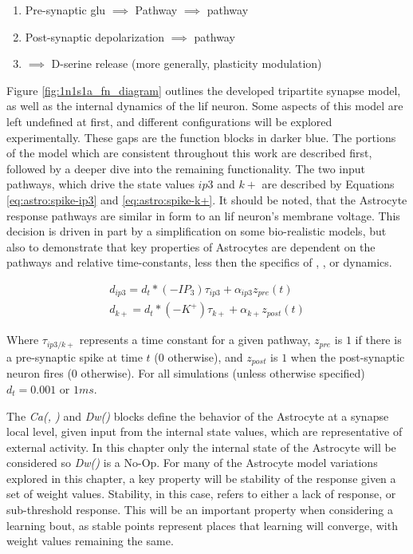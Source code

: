 \begin{enumerate}
  \item Pre-synaptic \Gls{glu} $\implies$ \ipt Pathway $\implies$ \ca pathway
  \item Post-synaptic depolarization \kp $\implies$ \ca pathway
  \item \ca $\implies$ D-serine release (more generally, plasticity modulation)
\end{enumerate}


Figure \ref{fig:1n1s1a_fn_diagram} outlines the developed tripartite synapse
model, as well as the internal dynamics of the \Gls{lif} neuron. Some aspects of this
model are left undefined at first, and different configurations will be explored
experimentally. These gaps are the function blocks in darker blue. The
portions of the model which are consistent throughout this work are described
first, followed by a deeper dive into the remaining functionality. The two input
pathways, which drive the state values $ip3$ and $k+$ are described by Equations
\ref{eq:astro:spike-ip3} and \ref{eq:astro:spike-k+}. It should be noted, that
the Astrocyte response pathways are similar in form to an \Gls{lif} neuron's membrane
voltage. This decision is driven in part by a simplification on some
bio-realistic models, but also to demonstrate that key properties of Astrocytes
are dependent on the pathways and relative time-constants, less then the specifics of
\ca, \ipt, or \kp dynamics.

\begin{align}
  d_{ip3} = d_t * (-IP_3)\tau_{ip3} + \alpha_{ip3} z_{pre}(t) \label{eq:astro:spike-ip3} \\
  d_{k+} = d_t * (-K^+)\tau_{k+} + \alpha_{k+} z_{post}(t) \label{eq:astro:spike-k+}
\end{align}

Where $\tau_{ip3/k+}$ represents a time constant for a given pathway, $z_{pre}$
is $1$ if there is a pre-synaptic spike at time $t$ ($0$ otherwise), and
$z_{post}$ is $1$ when the post-synaptic neuron fires ($0$ otherwise). For all
simulations (unless otherwise specified) $d_t = 0.001$ or $1ms$.

The \emph{Ca(\ipt, \kp)} and \emph{Dw(\ca)} blocks define the behavior
of the Astrocyte at a synapse local level, given input from the internal state values,
which are representative of external activity. In this chapter only the internal
state of the Astrocyte will be considered so \emph{Dw(\ca)} is a
No-Op. For many of the Astrocyte model variations explored in this chapter, a
key property will be stability of the response given a set of weight
values. Stability, in this case, refers to either a lack of \ca response, or
sub-threshold \ca response. This will be an important property when considering
a learning bout, as stable points represent places that learning will converge,
with weight values remaining the same.

